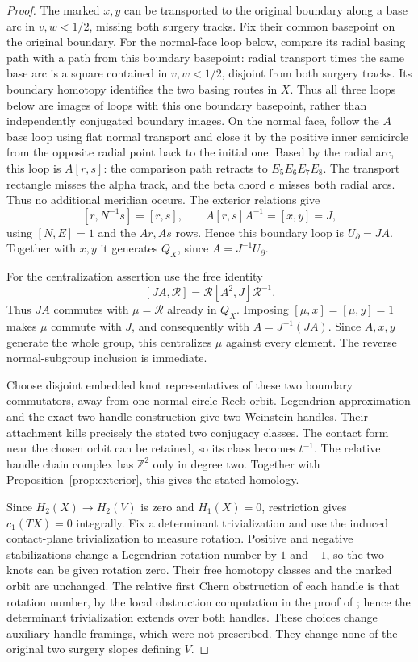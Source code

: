 \documentclass[11pt]{amsart}
\theoremstyle{definition}
\theoremstyle{remark}
\newcommand{\Z}{\mathbb Z}
\begin{document}
\begin{proof}
The marked $x,y$ can be transported to the original boundary along a
base arc in $v,w<1/2$, missing both surgery tracks. Fix their
common basepoint on the original boundary. For the normal-face loop
below, compare its radial basing path with a path from this boundary
basepoint: radial transport times the same base arc is a square
contained in $v,w<1/2$, disjoint from both surgery tracks. Its
boundary homotopy identifies the two basing routes in $X$.
Thus all three loops below are images of loops with this one boundary
basepoint, rather than independently conjugated boundary images.
On the normal face,
follow the $A$ base loop using flat normal transport and close it by
the positive inner semicircle from the opposite radial point back to
the initial one. Based by the radial arc, this loop is $A[r,s]$:
the comparison path retracts to $E_5E_6E_7E_8$. The transport
rectangle misses the alpha track, and the beta chord $e$ misses
both radial arcs. Thus no additional meridian occurs.
The exterior relations give
\[
 [r,N^{-1}s]=[r,s],\qquad A[r,s]A^{-1}=[x,y]=J,
\]
using $[N,E]=1$ and the $Ar,As$ rows. Hence this boundary loop is
$U_\partial=JA$. Together with $x,y$ it generates $Q_X$, since
$A=J^{-1}U_\partial$.

For the centralization assertion use the free identity
\[
 [JA,\mathcal R]=\mathcal R[A^2,J]\mathcal R^{-1}.
\]
Thus $JA$ commutes with $\mu=\mathcal R$ already in $Q_X$.
Imposing $[\mu,x]=[\mu,y]=1$ makes $\mu$ commute with $J$,
and consequently with $A=J^{-1}(JA)$. Since $A,x,y$ generate the
whole group, this centralizes $\mu$ against every element. The reverse
normal-subgroup inclusion is immediate.

Choose disjoint embedded knot representatives of these two boundary
commutators, away from one normal-circle Reeb orbit. Legendrian
approximation and the exact two-handle construction \cite{Wei91}
give two Weinstein handles. Their attachment kills precisely the
stated two conjugacy classes. The contact form near the chosen orbit
can be retained, so its class becomes $t^{-1}$. The relative handle
chain complex has $\Z^2$ only in degree two. Together with
Proposition~\ref{prop:exterior}, this gives the stated homology.

Since $H_2(X)\to H_2(V)$ is zero and $H_1(X)=0$, restriction gives
$c_1(TX)=0$ integrally. Fix a determinant trivialization and use
the induced contact-plane trivialization to measure rotation. Positive
and negative stabilizations change a Legendrian rotation number by
$1$ and $-1$, so the two knots can be given rotation zero. Their free
homotopy classes and the marked orbit are unchanged. The relative
first Chern obstruction of each handle is that rotation number,
by the local obstruction computation in the proof of
\cite[Proposition 2.3]{Gom98}; hence the determinant trivialization
extends over both handles. These choices change auxiliary handle
framings, which were not prescribed. They change none of the original
two surgery slopes defining $V$.
\end{proof}
\end{document}

